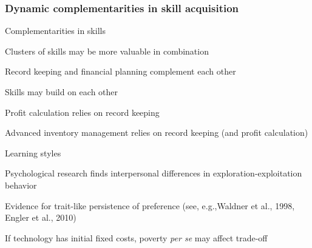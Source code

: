 \documentclass[hideothersubsections, usenames,dvipsnames,11pt]{beamer}
\newenvironment{itemize_2pt}{\itemize\addtolength{\itemsep}{2pt}}{\enditemize}
\begin{document}
\begin{frame}
\frametitle{Dynamic complementarities in skill acquisition}

Complementarities in skills
\begin{itemize_2pt}
	\item Clusters of skills may be more valuable in combination
	\begin{itemize_2pt}
		\item Record keeping and financial planning complement each other
	\end{itemize_2pt}
	\item Skills may build on each other
	\begin{itemize_2pt}
		\item Profit calculation relies on record keeping
		\item Advanced inventory management relies on record keeping (and profit calculation)
	\end{itemize_2pt}
\end{itemize_2pt}

\vspace{1.0em}

Learning styles
\begin{itemize_2pt}
	\item Psychological research finds interpersonal differences in \textcolor{bdf}{exploration-exploitation behavior} 
	\begin{itemize_2pt}
		\item Evidence for trait-like persistence of preference (see, e.g.,\textcolor{camel}{Waldner et al., 1998, Engler et al., 2010})
		\item If technology has initial fixed costs, poverty \textit{per se} may affect trade-off
	\end{itemize_2pt}
	
\end{itemize_2pt}

\end{frame}
\end{document}
